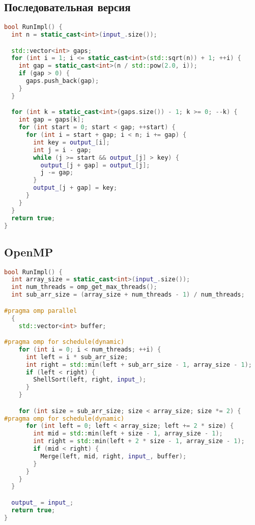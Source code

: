 \documentclass[a4paper,12pt]{article}
\begin{document}
\subsection{Последовательная версия}
\begin{lstlisting}[language=C++]
bool RunImpl() {
  int n = static_cast<int>(input_.size());

  std::vector<int> gaps;
  for (int i = 1; i <= static_cast<int>(std::sqrt(n)) + 1; ++i) {
    int gap = static_cast<int>(n / std::pow(2.0, i));
    if (gap > 0) {
      gaps.push_back(gap);
    }
  }

  for (int k = static_cast<int>(gaps.size()) - 1; k >= 0; --k) {
    int gap = gaps[k];
    for (int start = 0; start < gap; ++start) {
      for (int i = start + gap; i < n; i += gap) {
        int key = output_[i];
        int j = i - gap;
        while (j >= start && output_[j] > key) {
          output_[j + gap] = output_[j];
          j -= gap;
        }
        output_[j + gap] = key;
      }
    }
  }
  return true;
}
\end{lstlisting}

\subsection{OpenMP}
\begin{lstlisting}[language=C++]
bool RunImpl() {
  int array_size = static_cast<int>(input_.size());
  int num_threads = omp_get_max_threads();
  int sub_arr_size = (array_size + num_threads - 1) / num_threads;

#pragma omp parallel
  {
    std::vector<int> buffer;

#pragma omp for schedule(dynamic)
    for (int i = 0; i < num_threads; ++i) {
      int left = i * sub_arr_size;
      int right = std::min(left + sub_arr_size - 1, array_size - 1);
      if (left < right) {
        ShellSort(left, right, input_);
      }
    }

    for (int size = sub_arr_size; size < array_size; size *= 2) {
#pragma omp for schedule(dynamic)
      for (int left = 0; left < array_size; left += 2 * size) {
        int mid = std::min(left + size - 1, array_size - 1);
        int right = std::min(left + 2 * size - 1, array_size - 1);
        if (mid < right) {
          Merge(left, mid, right, input_, buffer);
        }
      }
    }
  }

  output_ = input_;
  return true;
}
\end{lstlisting}
\end{document}
